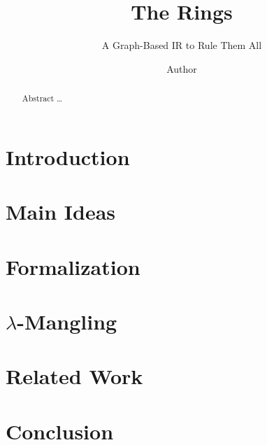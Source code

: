 \documentclass[acmsmall,nonacm=true,screen=true,timestamp=true]{acmart}
\begin{document}
\title{The Rings}
\subtitle{A Graph-Based IR to Rule Them All}
\author{Author}

\begin{abstract}
  Abstract \ldots
\end{abstract}

\maketitle



\section{Introduction}
\label{sec:intro}


\section{Main Ideas}
\label{sec:mainideas}


\section{Formalization}
\label{sec:formalization}


\section{$\lambda$-Mangling}
\label{sec:lammangle}


\section{Related Work}
\label{sec:relatedwork}


\section{Conclusion}
\label{sec:conclusion}



\end{document}
